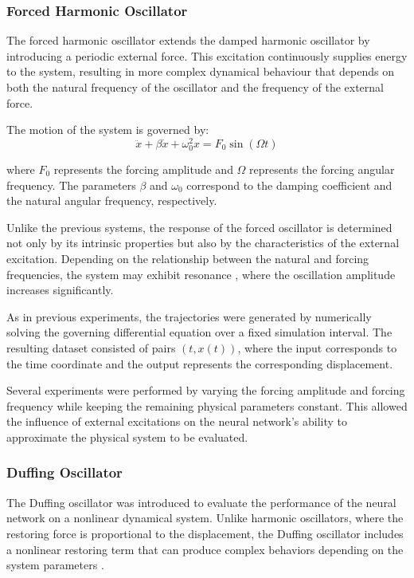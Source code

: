 \subsubsection{Forced Harmonic Oscillator}
The forced harmonic oscillator extends the damped harmonic oscillator by introducing a periodic external force. This excitation continuously supplies energy to the system, resulting in more complex dynamical behaviour that depends on both the natural frequency of the oscillator and the frequency of the external force.

The motion of the system is governed by:
\begin{equation}
    \ddot{x}+\beta \dot{x}+\omega_0^2x=F_0\sin(\Omega t)
\end{equation}

where $F_0$ represents the forcing amplitude and $\Omega$ represents the forcing angular frequency. The parameters $\beta$ and $\omega_0$ correspond to the damping coefficient and the natural angular frequency, respectively.

Unlike the previous systems, the response of the forced oscillator is determined not only by its intrinsic properties but also by the characteristics of the external excitation. Depending on the relationship between the natural and forcing frequencies, the system may exhibit resonance \cite{landau1986mechanics}, where the oscillation amplitude increases significantly.

As in previous experiments, the trajectories were generated by numerically solving the governing differential equation over a fixed simulation interval. The resulting dataset consisted of pairs $(t,x(t))$, where the input corresponds to the time coordinate and the output represents the corresponding displacement.

Several experiments were performed by varying the forcing amplitude and forcing frequency while keeping the remaining physical parameters constant. This allowed the influence of external excitations on the neural network's ability to approximate the physical system to be evaluated.

\subsubsection{Duffing Oscillator}
The Duffing oscillator was introduced to evaluate the performance of the neural network on a nonlinear dynamical system. Unlike harmonic oscillators, where the restoring force is proportional to the displacement, the Duffing oscillator includes a nonlinear restoring term that can produce complex behaviors depending on the system parameters \cite{strogatz2015nonlinear}.

